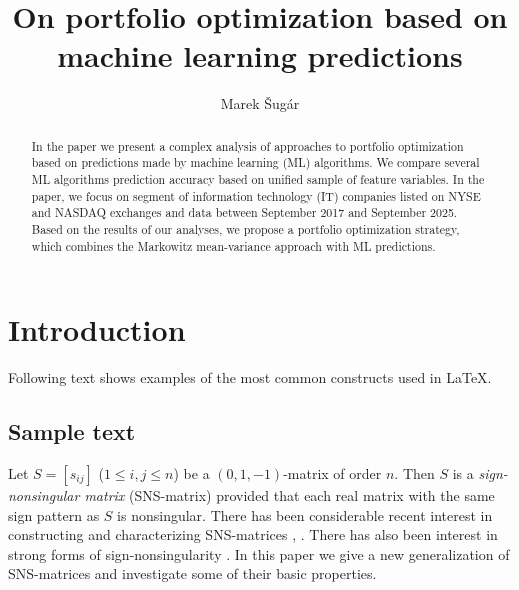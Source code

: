\documentclass{svk_en}
\begin{document}
\title{On portfolio optimization based on machine learning predictions}

\author{Marek Šugár
}






\maketitle

\begin{abstract}
In the paper we present a complex analysis of approaches to portfolio optimization based on predictions made by machine learning (ML)
algorithms. We compare several ML algorithms prediction accuracy based on unified sample of feature variables. In the paper, we focus on 
segment of information technology (IT) companies listed on NYSE and NASDAQ exchanges and data between September 2017 and September 2025. Based on the results of our analyses, we propose a portfolio optimization strategy,
which combines the Markowitz mean-variance approach with ML predictions. 

\end{abstract}

\section{Introduction}


Following text shows examples of the most common constructs
used in \LaTeX.

\subsection{Sample text}
Let $S=[s_{ij}]$ ($1\leq i,j\leq n$) be a $(0,1,-1)$-matrix
of order $n$. Then $S$ is a {\em sign-nonsingular matrix}
(SNS-matrix) provided that each real matrix with the same
sign pattern as $S$ is nonsingular. There has been
considerable recent interest in constructing and
characterizing SNS-matrices \cite{bs}, \cite{klm}. There
has also been interest in strong forms of
sign-nonsingularity \cite{djd}. In this paper we give a new
generalization of SNS-matrices and investigate some of
their basic properties.
 
\end{document}
